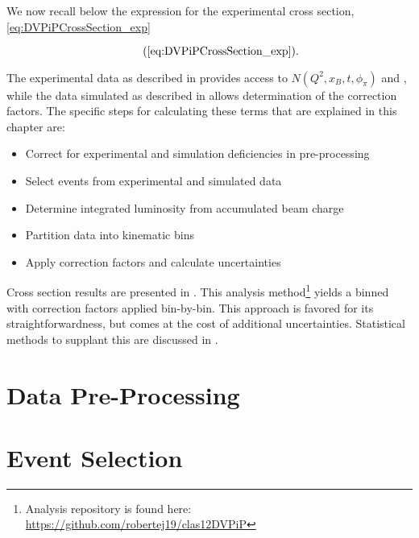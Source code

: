 We now recall below the expression for the experimental cross section, \eqref{eq:DVPiPCrossSection_exp}

        \begin{equation*}
          \recallLabel{eq:DVPiPCrossSection_exp}.
        \end{equation*}

The experimental data as described in  provides access to $N(Q^2,x_B,t,\phi_{\pi})$ and \Lumiint, while the data simulated as described in  allows determination of the correction factors. The specific steps for calculating these terms that are explained in this chapter are: 


\begin{itemize}
  \item Correct for experimental and simulation deficiencies in pre-processing 
  \item Select \dvpip events from experimental and simulated data 
  \item Determine integrated luminosity from accumulated beam charge 
  \item Partition data into kinematic bins 
  \item Apply correction factors and calculate uncertainties 
\end{itemize}

Cross section results are presented in . This analysis method\footnote{Analysis repository is found here:  \href{https://github.com/robertej19/clas12DVPiP}{https://github.com/robertej19/clas12DVPiP}}
  yields a binned \xsec with correction factors applied bin-by-bin. This approach is favored for its straightforwardness, but comes at the cost of additional uncertainties. Statistical methods to supplant this are discussed in . 


\section{Data Pre-Processing}\label{sec:Ch4_data_preprocess}
    
    \clearpage
    
\section{Event Selection}\label{sec:Ch4_event_selection}
    
    \clearpage
    
